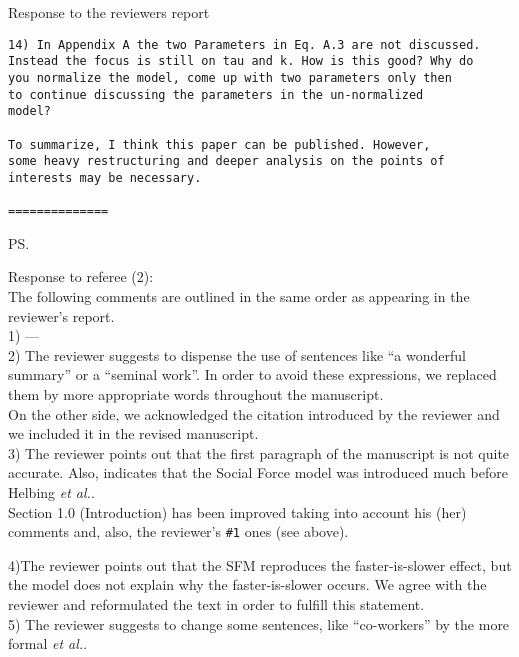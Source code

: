\documentclass[a4paper,12pt]{letter}
\begin{document}
\begin{letter}{Response to the reviewers report}
\begin{verbatim}
14) In Appendix A the two Parameters in Eq. A.3 are not discussed. 
Instead the focus is still on tau and k. How is this good? Why do 
you normalize the model, come up with two parameters only then 
to continue discussing the parameters in the un-normalized 
model?

To summarize, I think this paper can be published. However, 
some heavy restructuring and deeper analysis on the points of 
interests may be necessary. 

==============

\end{verbatim}


\ps{Response to referee (2): \\

The following comments are outlined in the same order as appearing in the
reviewer’s report. \\

1) ---\\

2) The reviewer suggests to dispense the use of sentences like ``a wonderful 
summary'' or a ``seminal work''. In order to avoid these expressions, we 
replaced them by more appropriate words throughout the manuscript. \\

On the other side, we acknowledged the citation introduced by the reviewer and 
we included it in the revised manuscript. \\

3) The reviewer points out that the first paragraph of the manuscript is not 
quite accurate. Also, indicates that the Social Force model was introduced much 
before Helbing \textit{et al.}. \\

Section 1.0 (Introduction) has been improved taking into account his (her) 
comments and, also, the reviewer's \verb?#1? ones (see above). 


4)The reviewer points out that the SFM reproduces the faster-is-slower effect, but the model
does not explain why the faster-is-slower occurs. We agree with the reviewer and reformulated 
the text in order to fulfill this statement.\\

5) The reviewer suggests to change some sentences, like ``co-workers'' by 
the more formal \textit{et al.}. 

}
\end{letter}
\end{document}
